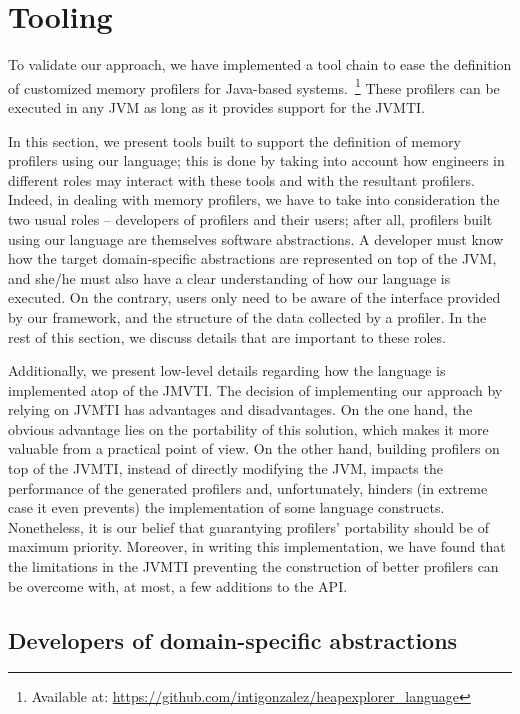\section{Tooling}\label{sec:dsl-implementation}

To validate our approach, we have implemented a tool chain to ease the definition of customized memory profilers for Java-based systems.~\footnote{Available at: \url{https://github.com/intigonzalez/heapexplorer\_language}}
These profilers can be executed in any JVM as long as it provides support for the JVMTI.

In this section, we present tools built to support the definition of memory profilers using our language; this is done by taking into account how engineers in different roles may interact with these tools and with the resultant profilers.
Indeed, in dealing with memory profilers, we have to take into consideration the two usual roles -- developers of profilers and their users; after all, profilers built using our language are themselves software abstractions.
A developer must know how the target domain-specific abstractions are represented on top of the JVM, and she/he must also have a clear understanding of how our language is executed.
On the contrary, users only need to be aware of the interface provided by our framework, and the structure of the data collected by a profiler.
In the rest of this section, we discuss details that are important to these roles.

Additionally, we present low-level details regarding how the language is implemented atop of the JMVTI.
The decision of implementing our approach by relying on JVMTI has advantages and disadvantages.
On the one hand, the obvious advantage lies on the portability of this solution, which makes it more valuable from a practical point of view.
On the other hand, building profilers on top of the JVMTI, instead of directly modifying the JVM, impacts the performance of the generated profilers and, unfortunately, hinders (in extreme case it even prevents) the implementation of some language constructs.
Nonetheless, it is our belief that guarantying profilers' portability should be of maximum priority.
Moreover, in writing this implementation, we have found that the limitations in the JVMTI preventing the construction of better profilers can be overcome with, at most, a few additions to the API.


\subsection{Developers of domain-specific abstractions}

